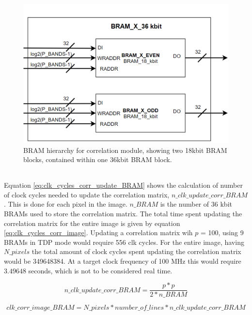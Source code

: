 


\begin{figure}[H]
\centering

   \includegraphics[scale=0.5]{images/BRAM_two_18_kbit.PNG}
  \caption{BRAM hierarchy for correlation module, showing two 18kbit BRAM blocks, contained within one 36kbit BRAM block. } 
  \label{fig:BRAM_hierarchy}
\end{figure}

\\


Equation \ref{eq:clk_cycles_corr_update_BRAM} shows the calculation of number of clock cycles needed to update the correlation matrix, $n\_clk\_update\_corr\_BRAM$. This is done for each pixel in the image. $n\_BRAM$ is the number of 36 kbit BRAMs used to store the correlation matrix. The total time spent updating the correlation matrix for the entire image is given by equation \ref{eq:clk_cycles_corr_image}. Updating a correlation matrix wih $p$ = 100, using 9 BRAMs in TDP mode would require 556 clk cycles. For the entire image, having $N\_pixels$ the total amount of clock cycles spent updating the correlation matrix would be 349648384. At a target clock frequency of 100 MHz this would require $3.49648$ seconds, which is not to be considered real time.   

\begin{equation}
    n\_clk\_update\_corr\_BRAM = \frac{p * p }{2 * n\_BRAM}
    \label{eq:clk_cycles_corr_update_BRAM}
\end{equation}

\begin{equation}
    clk\_corr\_image\_BRAM = N\_pixels *number\_of\_lines * n\_clk\_update\_corr\_BRAM
    \label{eq:clk_cycles_corr_image}
\end{equation}


